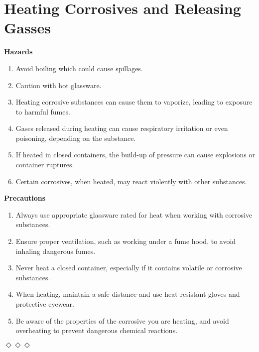 \documentclass{report}
\begin{document}
\section*{Heating Corrosives and Releasing Gasses}{
	\textbf{Hazards}
	\begin{enumerate}
		\item Avoid boiling which could cause spillages.
		\item Caution with hot glassware.
		\item Heating corrosive substances can cause them to vaporize, leading to exposure to harmful fumes.
		\item Gases released during heating can cause respiratory irritation or even poisoning, depending on the substance.
		\item If heated in closed containers, the build-up of pressure can cause explosions or container ruptures.
		\item Certain corrosives, when heated, may react violently with other substances.
	\end{enumerate}
	\textbf{Precautions}
	\begin{enumerate}
		\item Always use appropriate glassware rated for heat when working with corrosive substances.
		\item Ensure proper ventilation, such as working under a fume hood, to avoid inhaling dangerous fumes.
		\item Never heat a closed container, especially if it contains volatile or corrosive substances.
		\item When heating, maintain a safe distance and use heat-resistant gloves and protective eyewear.
		\item Be aware of the properties of the corrosive you are heating, and avoid overheating to prevent dangerous chemical reactions.
	\end{enumerate}
}

\bigskip
\centerline{$\Diamond\Diamond\Diamond$} %
\bigskip
\end{document}
